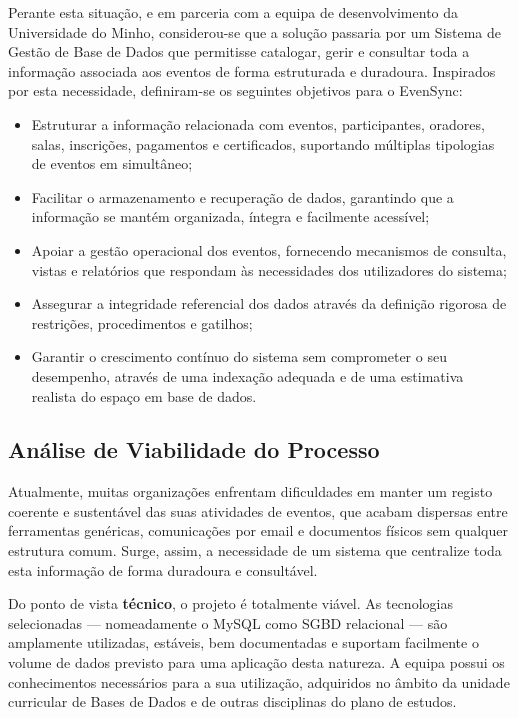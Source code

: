 \documentclass[runningheads]{llncs}
\begin{document}
                \vspace{0.3cm}
                Perante esta situação, e em parceria com a equipa de desenvolvimento da Universidade do Minho, considerou-se
                que a solução passaria por um Sistema de Gestão de Base de Dados que permitisse catalogar, gerir e consultar
                toda a informação associada aos eventos de forma estruturada e duradoura. Inspirados por esta necessidade, 
                definiram-se os seguintes objetivos para o EvenSync:

                \begin{itemize}
                        \item Estruturar a informação relacionada com eventos, participantes, oradores, salas, inscrições, pagamentos e certificados, suportando múltiplas tipologias de eventos em simultâneo;
                        \item Facilitar o armazenamento e recuperação de dados, garantindo que a informação se mantém organizada, íntegra e facilmente acessível;
                        \item Apoiar a gestão operacional dos eventos, fornecendo mecanismos de consulta, vistas e relatórios que respondam às necessidades dos utilizadores do sistema;
                        \item Assegurar a integridade referencial dos dados através da definição rigorosa de restrições, procedimentos e gatilhos;
                        \item Garantir o crescimento contínuo do sistema sem comprometer o seu desempenho, através de uma indexação adequada e de uma estimativa realista do espaço em base de dados.
                \end{itemize}
                
                \subsection{Análise de Viabilidade do Processo}
                Atualmente, muitas organizações enfrentam dificuldades em manter um registo coerente e sustentável das suas atividades de eventos, 
                que acabam dispersas entre ferramentas genéricas, comunicações por email e documentos físicos sem qualquer
                estrutura comum. Surge, assim, a necessidade de um sistema que centralize toda esta informação de forma duradoura e consultável.
               
                \vspace{0.3cm}
                Do ponto de vista \textbf{técnico}, o projeto é totalmente viável. As tecnologias selecionadas — nomeadamente o MySQL 
                como SGBD relacional — são amplamente utilizadas, estáveis, bem documentadas e suportam facilmente o volume de dados
                previsto para uma aplicação desta natureza. A equipa possui os conhecimentos necessários para a sua utilização, adquiridos 
                no âmbito da unidade curricular de Bases de Dados e de outras disciplinas do plano de estudos.
                
\end{document}

